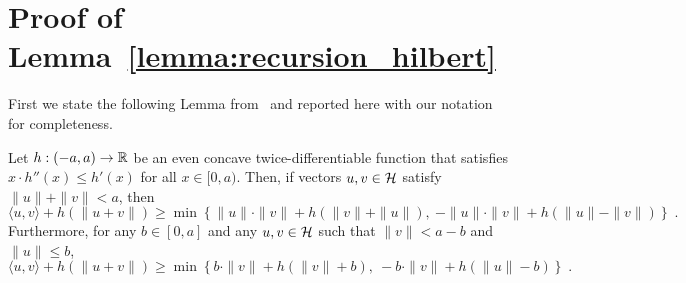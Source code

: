 \section{Proof of Lemma~\ref{lemma:recursion_hilbert}}
\label{section:hilbert-space-reduction}

First we state the following Lemma from~\cite{McMahanO14} and reported here with our notation for completeness.
\begin{lemma}[Extremes]
\label{lemma:extremes}
Let $h:(-a,a) \to \mathbb{R}$ be an even concave twice-differentiable function that
satisfies $x \cdot h''(x) \le h'(x)$ for all $x \in [0,a)$. Then, if vectors
$u,v \in \mathcal{H}$ satisfy $\|u\| + \|v\| < a$, then
\begin{equation}
\label{equation:lemma-extremes-1}
\langle u, v \rangle + h(\|u + v\|) \ge \min \left\{ \|u\| \cdot \|v\| + h(\|v\| + \|u\|), \ - \|u\| \cdot \|v\| + h(\|u\| - \|v\|) \right\} \; .
\end{equation}
Furthermore, for any $b \in [0,a]$ and any $u, v \in \mathcal{H}$ such that $\|v\| < a - b$ and $\|u\| \le b$,
\begin{equation}
\label{equation:lemma-extremes-2}
\langle u, v \rangle + h(\|u + v\|) \ge \min \left\{ b \cdot \|v\| + h(\|v\| + b), \ - b \cdot \|v\| + h(\|u\| - b) \right\} \; .
\end{equation}
\end{lemma}
%

